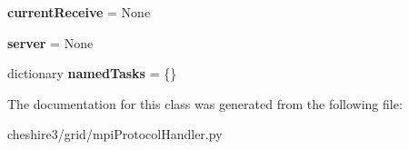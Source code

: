 \begin{DoxyCompactItemize}
\item 
\hypertarget{classcheshire3_1_1grid_1_1mpi_protocol_handler_1_1_task_manager_a4584fa6cdca0c45352cc284bdf0a6637}{{\bfseries current\-Receive} = None}\label{classcheshire3_1_1grid_1_1mpi_protocol_handler_1_1_task_manager_a4584fa6cdca0c45352cc284bdf0a6637}

\item 
\hypertarget{classcheshire3_1_1grid_1_1mpi_protocol_handler_1_1_task_manager_ac1eaacee1d41695f0a96be3dec0862c0}{{\bfseries server} = None}\label{classcheshire3_1_1grid_1_1mpi_protocol_handler_1_1_task_manager_ac1eaacee1d41695f0a96be3dec0862c0}

\item 
\hypertarget{classcheshire3_1_1grid_1_1mpi_protocol_handler_1_1_task_manager_a28918be0af3c12d5e48bfcc514d23849}{dictionary {\bfseries named\-Tasks} = \{\}}\label{classcheshire3_1_1grid_1_1mpi_protocol_handler_1_1_task_manager_a28918be0af3c12d5e48bfcc514d23849}

\end{DoxyCompactItemize}


The documentation for this class was generated from the following file\-:\begin{DoxyCompactItemize}
\item 
cheshire3/grid/mpi\-Protocol\-Handler.\-py\end{DoxyCompactItemize}
